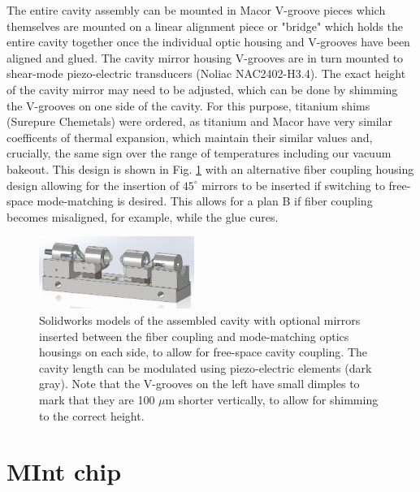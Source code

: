 The entire cavity assembly can be mounted in Macor V-groove pieces which themselves are mounted on a linear alignment piece or "bridge" which holds the entire cavity together once the individual optic housing and V-grooves have been aligned and glued. The cavity mirror housing V-grooves are in turn mounted to shear-mode piezo-electric transducers (Noliac NAC2402-H3.4). The exact height of the cavity mirror may need to be adjusted, which can be done by shimming the V-grooves on one side of the cavity. For this purpose, titanium shims (Surepure Chemetals) were ordered, as titanium and Macor have very similar coefficents of thermal expansion, which maintain their similar values and, crucially, the same sign over the range of temperatures including our vacuum bakeout. This design is shown in Fig. \ref{fig:cavitybridge} with an alternative fiber coupling housing design allowing for the insertion of $45^{\circ}$ mirrors to be inserted if switching to free-space mode-matching is desired. This allows for a plan B if fiber coupling becomes misaligned, for example, while the glue cures.
\begin{figure}[!ht]
    \centering
    \includegraphics[width=0.45\textwidth]{Images/cavitybridge.pdf}
    \caption{Solidworks models of the assembled cavity with optional mirrors inserted between the fiber coupling and mode-matching optics housings on each side, to allow for free-space cavity coupling. The cavity length can be modulated using piezo-electric elements (dark gray). Note that the V-grooves on the left have small dimples to mark that they are 100 $\mu \mathrm{m}$ shorter vertically, to allow for shimming to the correct height.}
    \label{fig:cavitybridge}
\end{figure}

\section{MInt chip}\label{sec:mintchip}

